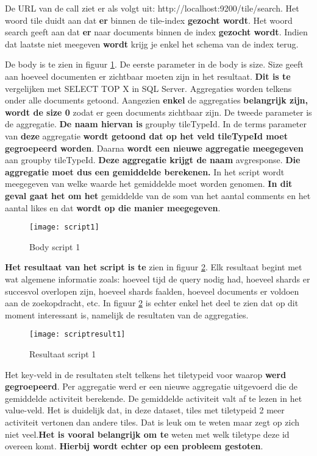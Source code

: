 De URL van de call ziet er als volgt uit: http://localhost:9200/tile/\textunderscore search. Het woord tile duidt aan dat \textbf{er} binnen de tile-index \textbf{gezocht wordt}. Het woord \textunderscore search geeft aan dat \textbf{er} naar documents binnen de index \textbf{gezocht wordt}. Indien dat laatste niet meegeven \textbf{wordt} krijg je enkel het schema van de index terug.

De body is te zien in figuur \ref{fig:script1}. De eerste parameter in de body is size. Size geeft aan hoeveel documenten er zichtbaar moeten zijn in het resultaat. \textbf{Dit is te} vergelijken met SELECT TOP X in SQL Server. Aggregaties worden telkens onder alle documents getoond. Aangezien \textbf{enkel} de aggregaties \textbf{belangrijk zijn, wordt de size 0} zodat er geen documents zichtbaar zijn. De tweede parameter is de aggregatie. \textbf{De naam hiervan is } group\textunderscore by \textunderscore tileTypeId. In de terms parameter van \textbf{deze} aggregatie \textbf{wordt getoond dat op het veld tileTypeId moet gegroepeerd worden}. Daarna \textbf{wordt een nieuwe aggregatie meegegeven} aan group\textunderscore by \textunderscore tileTypeId. \textbf{Deze aggregatie krijgt de naam} avg\textunderscore response. \textbf{Die aggregatie moet dus een gemiddelde berekenen.} In het script wordt meegegeven van welke waarde het gemiddelde moet worden genomen. \textbf{In dit geval gaat het om het} gemiddelde van de som van het aantal comments en het aantal likes en dat \textbf{wordt op die manier meegegeven}.

\begin{figure}
	\centering
	\texttt{[image: script1]}
	\caption{Body script 1}
	\label{fig:script1}
\end{figure}

\textbf{Het resultaat van het script is te} zien in figuur \ref{fig:scriptresult1}. Elk resultaat begint met wat algemene informatie zoals: hoeveel tijd de query nodig had, hoeveel shards er succesvol overlopen zijn, hoeveel shards faalden, hoeveel documents er voldoen aan de zoekopdracht, etc. In figuur \ref{fig:scriptresult1} is echter enkel het deel te zien dat op dit moment interessant is, namelijk de resultaten van de aggregaties.

\begin{figure}
	\centering
	\texttt{[image: scriptresult1]}
	\caption{Resultaat script 1}
	\label{fig:scriptresult1}
\end{figure}

Het key-veld in de resultaten stelt telkens het tiletypeid voor waarop \textbf{werd gegroepeerd}. Per aggregatie werd er een nieuwe aggregatie uitgevoerd die de gemiddelde activiteit berekende. De gemiddelde activiteit valt af te lezen in het value-veld. Het is duidelijk dat, in deze dataset, tiles met tiletypeid 2 meer activiteit vertonen dan andere tiles. Dat is leuk om te weten maar zegt op zich niet veel.\textbf{Het is vooral belangrijk om te }weten met welk tiletype deze id overeen komt. \textbf{Hierbij wordt echter op een probleem gestoten}.

